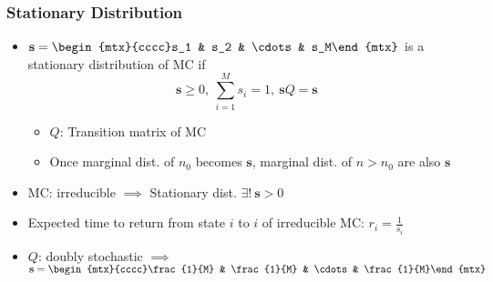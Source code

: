 \subsubsection*{Stationary Distribution}
\begin{itemize}
    \item $\mathbf{s}=\begin{mtx}{cccc}s_1 & s_2 & \cdots & s_M\end{mtx}$ is a stationary distribution of MC if
    \begin{equation}
        \mathbf{s}\geq 0,~\sum_{i=1}^Ms_i=1,~\mathbf{s}Q=\mathbf{s}
    \end{equation}
    \begin{itemize}
        \item $Q$: Transition matrix of MC
        \item Once marginal dist. of $n_0$ becomes $\mathbf{s}$, marginal dist. of $n>n_0$ are also $\mathbf{s}$
    \end{itemize}
    \item MC: irreducible $\implies$ Stationary dist. $\exists!~\mathbf{s}>0$
    \item Expected time to return from state $i$ to $i$ of irreducible MC: $r_i=\frac{1}{s_i}$
    \item $Q$: doubly stochastic $\implies$ $\mathbf{s}=\begin{mtx}{cccc}\frac{1}{M} & \frac{1}{M} & \cdots & \frac{1}{M}\end{mtx}$
\end{itemize}

